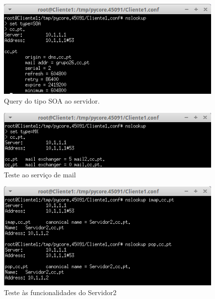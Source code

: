 \documentclass{llncs}
\begin{document}
\begin{figure}[H]
\begin{center}
\includegraphics[scale=0.75]{teste7.png}
\end{center}
\caption{\label{fig:t7}Query do tipo SOA ao servidor.}
\end{figure}

\begin{figure}[H]
\begin{center}
\includegraphics[scale=0.75]{teste8.png}
\end{center}
\caption{\label{fig:t8}Teste ao serviço de mail}
\end{figure}

\begin{figure}[H]
\begin{center}
\includegraphics[scale=0.75]{teste9.png}
\end{center}
\caption{\label{fig:t9}Teste às funcionalidades do Servidor2}
\end{figure}
\end{document}
